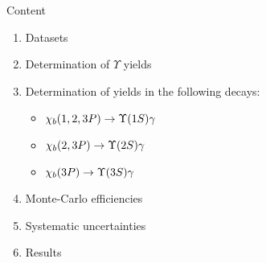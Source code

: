 \begin{frame}{Content}
\begin{enumerate}
\item Datasets
\item Determination of $\Upsilon$ yields
\item Determination of \chib yields in the following decays:
\begin{itemize}
    \item $\chi_b(1,2,3P) \to \OneS \gamma$
    \item $\chi_b(2,3P) \to \TwoS \gamma$
    \item $\chi_b(3P) \to \ThreeS \gamma$
\end{itemize}
\item Monte-Carlo efficiencies
\item Systematic uncertainties 
\item Results
\end{enumerate}
\end{frame}
